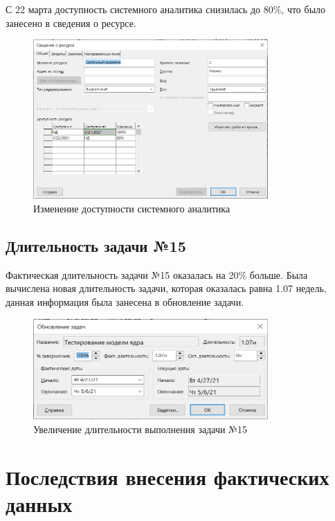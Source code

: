 С 22 марта доступность системного аналитика снизилась до 80\%, что было занесено в сведения о ресурсе.

\begin{figure}[H]
    \centering
    \includegraphics[width=0.8\textwidth]{img/content/5.png}
    \caption{Изменение доступности системного аналитика}
    \label{fig:5}
\end{figure}

\subsection{Длительность задачи №15}

Фактическая длительность задачи №15 оказалась на 20\% больше. Была вычислена новая длительность задачи, которая оказалась равна 1.07 недель, данная информация была занесена в обновление задачи.

\begin{figure}[H]
    \centering
    \includegraphics[width=0.8\textwidth]{img/content/6.png}
    \caption{Увеличение длительности выполнения задачи №15}
    \label{fig:6}
\end{figure}

\section{Последствия внесения фактических данных}

